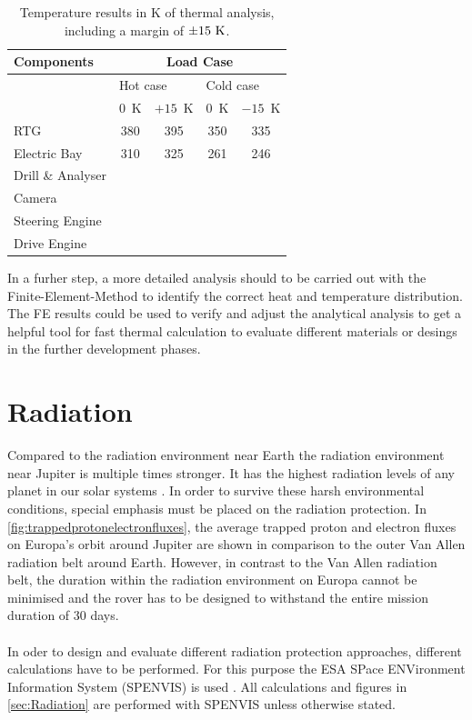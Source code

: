 \begin{table}[htb]
	\centering
	\caption{Temperature results in K of thermal analysis, including a margin of $\pm15\ {\rm K}$.}
	\begin{tabular}{l@{\qquad\qquad}cc@{\qquad}|@{\qquad}cc}
		\hline
		Components & \multicolumn{4}{c}{Load Case}   \\ \hline
		& \multicolumn{2}{l}{Hot case} & \multicolumn{2}{l}{Cold case} \\
		& $0$\ K & $+15$\ K & $0$\ K & $-15$\ K \\ \hline
		RTG  & 380 & 395 & 350 & 335   \\
		Electric Bay & 310 & 325 & 261 & 246  \\
		Drill \& Analyser & & & &  \\
		Camera & & & &  \\
		Steering Engine & & & &  \\
		Drive Engine & & & &  \\   \hline
	\end{tabular}
	\label{tab:tcs_temp}
\end{table}

In a furher step, a more detailed analysis should to be carried out with the Finite-Element-Method to identify the correct heat and temperature distribution.
The FE results could be used to verify and adjust the analytical analysis to get a helpful tool for fast thermal calculation to evaluate different materials or desings in the further development phases.


\clearpage

\section{Radiation} \label{sec:Radiation}

Compared to the radiation environment near Earth the radiation environment near Jupiter is multiple times stronger. It has the highest radiation levels of any planet in our solar systems \cite{Platzhalter}. In order to survive these harsh environmental conditions, special emphasis must be placed on the radiation protection. In \autoref{fig:trappedprotonelectronfluxes}, the average trapped proton and electron fluxes on Europa's orbit around Jupiter are shown in comparison to the outer Van Allen radiation belt around Earth. However, in contrast to the Van Allen radiation belt, the duration within the radiation environment on Europa cannot be minimised and the rover has to be designed to withstand the entire mission duration of 30 days. \\ \\
In oder to design and evaluate different radiation protection approaches, different calculations have to be performed. For this purpose the ESA SPace ENVironment Information System (SPENVIS) is used \cite{Platzhalter}. All calculations and figures in \autoref{sec:Radiation} are performed with SPENVIS unless otherwise stated.

